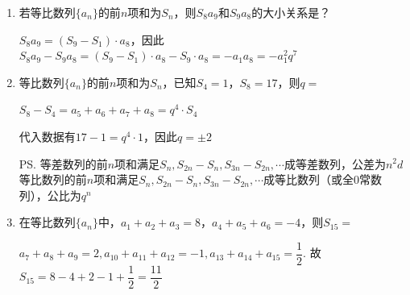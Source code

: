 \begin{enumerate}
    \item 若等比数列$\{a_n\}$的前$n$项和为$S_n$，则$S_8a_9$和$S_9a_8$的大小关系是？
    \begin{jieda}
        $S_8a_9 = (S_9 - S_1) \cdot a_8$，因此$S_8a_9 - S_9a_8 = (S_9 - S_1) \cdot a_8 - S_9 \cdot a_8 = -a_1a_8 = -a_1^2q^7$

        
    \end{jieda}

    \item 等比数列$\{a_n\}$的前$n$项和为$S_n$，已知$S_4 = 1$，$S_8 = 17$，则$q=$
    \begin{jieda}
        $S_8 - S_4 = a_5+a_6+a_7+a_8 = q^4 \cdot S_4$

        代入数据有$17-1 = q^4 \cdot 1$，因此$q = \pm 2$

        \ps 等差数列的前$n$项和满足$S_n, S_{2n}-S_n, S_{3n}-S_{2n}, \cdots$成等差数列，公差为$n^2d$ \\
        等比数列的前$n$项和满足$S_n, S_{2n}-S_n, S_{3n}-S_{2n}, \cdots$成等比数列（或全0常数列），公比为$q^n$
    \end{jieda}

    \item 在等比数列$\{a_n\}$中，$a_1 + a_2 + a_3 = 8$，$a_4 + a_5 + a_6 = -4$，则$S_{15} = $
    \begin{jieda}
        $a_7 + a_8 + a_9 = 2, a_{10} + a_{11} + a_{12} = -1, a_{13} + a_{14} + a_{15} = \dfrac{1}{2}$. 故$S_{15} = 8 - 4 + 2 - 1 + \dfrac{1}{2} = \dfrac{11}{2}$
    \end{jieda}
\end{enumerate}
